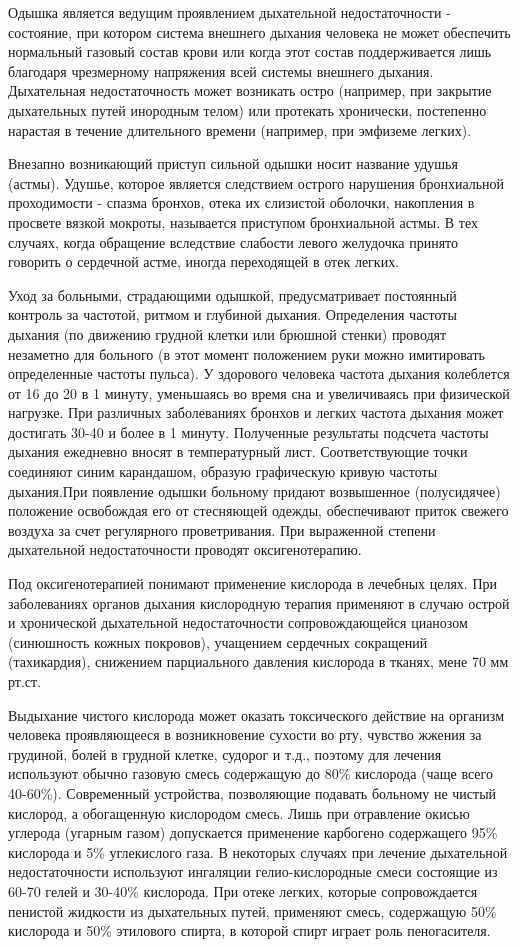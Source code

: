 \documentclass[a4paper,14pt]{extreport}
\begin{document}
Одышка является ведущим проявлением дыхательной недостаточности - состояние, при котором система внешнего дыхания человека не может  обеспечить нормальный газовый состав крови или когда этот состав поддерживается лишь благодаря чрезмерному напряжения всей системы внешнего дыхания. Дыхательная недостаточность может возникать остро (например, при закрытие дыхательных путей инородным телом) или протекать хронически, постепенно нарастая в течение длительного времени (например, при эмфиземе легких).

Внезапно возникающий приступ сильной одышки носит название удушья (астмы). Удушье, которое является следствием острого нарушения бронхиальной проходимости - спазма бронхов, отека их слизистой оболочки, накопления в просвете вязкой мокроты, называется приступом бронхиальной астмы. В тех случаях, когда обращение вследствие слабости левого желудочка принято говорить о сердечной астме, иногда переходящей в отек легких.

Уход за больными, страдающими одышкой, предусматривает постоянный контроль за частотой, ритмом и глубиной дыхания. Определения частоты дыхания (по движению грудной клетки или брюшной стенки) проводят незаметно для больного (в этот момент положением руки можно имитировать определенные частоты пульса). У здорового человека частота дыхания колеблется от 16 до 20 в 1 минуту, уменьшаясь во время сна и увеличиваясь при физической нагрузке. При различных заболеваниях бронхов и легких частота дыхания может достигать 30-40 и более в 1 минуту. Полученные результаты подсчета частоты дыхания ежедневно вносят в температурный лист. Соответствующие точки соединяют синим карандашом, образую графическую кривую частоты дыхания.При появление одышки больному придают возвышенное (полусидячее) положение освобождая его от стесняющей одежды, обеспечивают приток свежего воздуха за счет регулярного проветривания. При выраженной степени дыхательной недостаточности проводят оксигенотерапию.

Под оксигенотерапией понимают применение кислорода в лечебных целях. При заболеваниях органов дыхания кислородную терапия применяют в случаю острой и хронической дыхательной недостаточности сопровождающейся цианозом (синюшность кожных покровов), учащением сердечных сокращений (тахикардия), снижением парциального давления кислорода в тканях, мене 70 мм рт.ст. 

Выдыхание чистого кислорода может оказать токсического действие на организм человека проявляющееся в возникновение сухости во рту, чувство жжения за грудиной, болей в грудной клетке, судорог и т.д., поэтому для лечения используют обычно газовую смесь содержащую до 80\% кислорода (чаще всего 40-60\%). Современный устройства, позволяющие подавать больному не чистый кислород, а обогащенную кислородом смесь. Лишь при отравление окисью углерода (угарным газом) допускается применение карбогено содержащего 95\% кислорода и 5\% углекислого газа. В некоторых случаях при лечение дыхательной недостаточности используют ингаляции гелио-кислородные смеси состоящие из 60-70 гелей и 30-40\% кислорода. 
При отеке легких, которые сопровождается пенистой жидкости из дыхательных путей, применяют смесь, содержащую 50\% кислорода и 50\% этилового спирта, в которой спирт играет роль пеногасителя.
\end{document}

